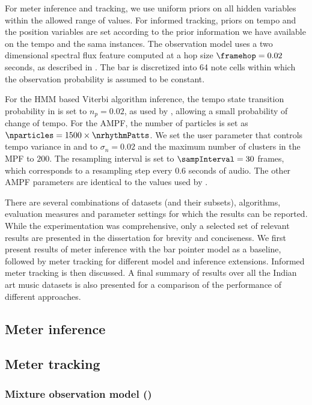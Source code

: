 For meter inference and tracking, we use uniform priors on all hidden variables within the allowed range of values. For informed tracking, priors on tempo and the position variables are set according to the prior information we have available on the tempo and the \gls{sama} instances. The observation model uses a two dimensional spectral flux feature computed at a hop size $\framehop = 0.02$ seconds, as described in . The bar is discretized into 64 note cells within which the observation probability is assumed to be constant. 

For the \gls{HMM} based Viterbi algorithm inference, the tempo state transition probability in  is set to $n_p=0.02$, as used by , allowing a small probability of change of tempo. For the \gls{AMPF}, the number of particles is set as $\nparticles = 1500 \times \nrhythmPatts$. We set the user parameter that controls tempo variance in  and  to $\sigma_n = 0.02$ and the maximum number of clusters in the \gls{MPF} to $200$. The resampling interval is set to $\sampInterval = 30$ frames, which corresponds to a resampling step every $0.6$ seconds of audio. The other \gls{AMPF} parameters are identical to the values used by . 

There are several combinations of datasets (and their subsets), algorithms, evaluation measures and parameter settings for which the results can be reported. While the experimentation was comprehensive, only a selected set of relevant results are presented in the dissertation for brevity and conciseness. We first present results of meter inference with the bar pointer model as a baseline, followed by meter tracking for different model and inference extensions. Informed meter tracking is then discussed. A final summary of results over all the Indian art music datasets is also presented for a comparison of the performance of different approaches. 
\subsection{Meter inference}\label{sec:res:meterInf}

%
\subsection{Meter tracking}\label{sec:res:meterTrack}

% 
\subsubsection{Mixture observation model (\momodel)}

% 
